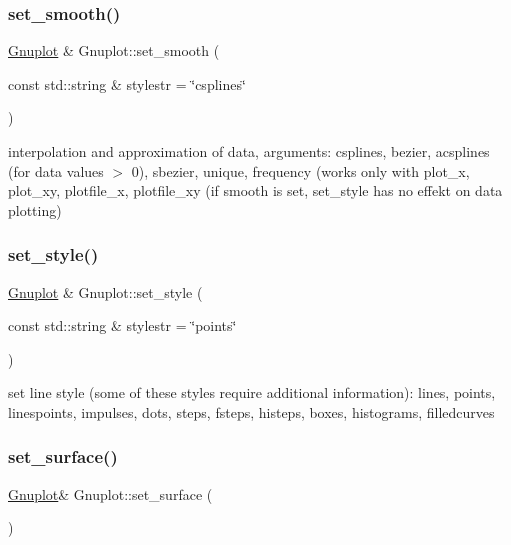 \subsubsection{\texorpdfstring{set\+\_\+smooth()}{set\_smooth()}}
{\footnotesize\ttfamily \hyperlink{classGnuplot}{Gnuplot} \& Gnuplot\+::set\+\_\+smooth (\begin{DoxyParamCaption}\item[{const std\+::string \&}]{stylestr = {\ttfamily \char`\"{}csplines\char`\"{}} }\end{DoxyParamCaption})}

interpolation and approximation of data, arguments\+: csplines, bezier, acsplines (for data values $>$ 0), sbezier, unique, frequency (works only with plot\+\_\+x, plot\+\_\+xy, plotfile\+\_\+x, plotfile\+\_\+xy (if smooth is set, set\+\_\+style has no effekt on data plotting) \mbox{\label{classGnuplot_acfdcda292650775ebed4683e8e1515b5}} 
\subsubsection{\texorpdfstring{set\+\_\+style()}{set\_style()}}
{\footnotesize\ttfamily \hyperlink{classGnuplot}{Gnuplot} \& Gnuplot\+::set\+\_\+style (\begin{DoxyParamCaption}\item[{const std\+::string \&}]{stylestr = {\ttfamily \char`\"{}points\char`\"{}} }\end{DoxyParamCaption})}

set line style (some of these styles require additional information)\+: lines, points, linespoints, impulses, dots, steps, fsteps, histeps, boxes, histograms, filledcurves \mbox{\label{classGnuplot_a9825bd26500e30ca88404c4807e6607a}} 
\subsubsection{\texorpdfstring{set\+\_\+surface()}{set\_surface()}}
{\footnotesize\ttfamily \hyperlink{classGnuplot}{Gnuplot}\& Gnuplot\+::set\+\_\+surface (\begin{DoxyParamCaption}{ }\end{DoxyParamCaption})\hspace{0.3cm}{\ttfamily [inline]}}

